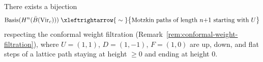 \begin{theorem}
\label{thm:motzkin-path-model}
There exists a bijection
\begin{equation}\label{eq:motzkin-bijection}
\operatorname{Basis}(H^n(\bar{B}(\mathrm{Vir}_c)))
\;\xleftrightarrow{\;\sim\;}
\bigl\{\text{Motzkin paths of length $n{+}1$ starting with $U$}\bigr\}
\end{equation}
respecting the conformal weight filtration
\textup{(}Remark~\textup{\ref{rem:conformal-weight-filtration})},
where $U = (1,1)$, $D = (1,-1)$, $F = (1,0)$
are up, down, and flat steps of a lattice path staying
at height $\geq 0$ and ending at height $0$.
\end{theorem}

